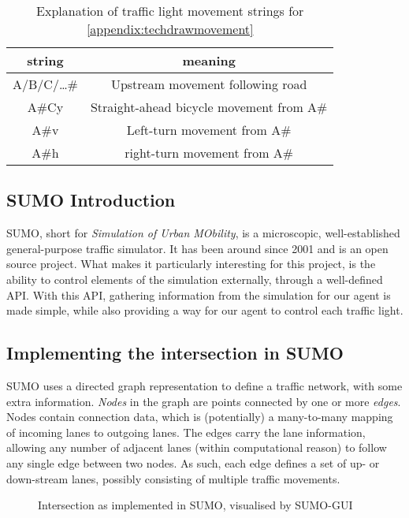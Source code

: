 \begin{table}[!htb]
  \centering
  \begin{tabular}{|c|c|}\hline
      string & meaning \\\hline
       A/B/C/\ldots\# & Upstream movement following road\\\hline
       A\#Cy & Straight-ahead bicycle movement from A\#\\\hline
       A\#v & Left-turn movement from A\#\\\hline
       A\#h & right-turn movement from A\#\\\hline
  \end{tabular}
  \caption{Explanation of traffic light movement strings for \cref{appendix:techdrawmovement}\\}
  \label{tab:intersectionmovements}
\end{table}

\subsection{SUMO Introduction}
SUMO, short for \textit{Simulation of Urban MObility}, is a microscopic, well-established general-purpose traffic simulator. It has been around since 2001 and is an open source project. What makes it particularly interesting for this project, is the ability to control elements of the simulation externally, through a well-defined API. With this API, gathering information from the simulation for our agent is made simple, while also providing a way for our agent to control each traffic light.

\subsection{Implementing the intersection in SUMO}
SUMO uses a directed graph representation to define a traffic network, with some extra information. 
\textit{Nodes} in the graph are points connected by one or more \textit{edges}. Nodes contain connection data, which is (potentially) a many-to-many mapping of incoming lanes to outgoing lanes. The edges carry the lane information, allowing any number of adjacent lanes (within computational reason) to follow any single edge between two nodes. As such, each edge defines a set of up- or down-stream lanes, possibly consisting of multiple traffic movements.


\begin{figure}[!htb]
  \centering
  \caption{Intersection as implemented in SUMO, visualised by SUMO-GUI\\}
  \label{fig:sumointerimpl}
\end{figure}

